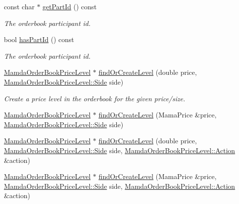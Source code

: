 \begin{CompactItemize}
const char $\ast$ \hyperlink{classWombat_1_1MamdaOrderBook_f7cd8457407380b1299466ba3e142bad}{get\-Part\-Id} () const 
\begin{CompactList}\small\item\em The orderbook participant id. \item\end{CompactList}\item 
bool \hyperlink{classWombat_1_1MamdaOrderBook_967fe8850a71364c5fef5e119d0d39a6}{has\-Part\-Id} () const 
\begin{CompactList}\small\item\em The orderbook participant id. \item\end{CompactList}\item 
\hyperlink{classWombat_1_1MamdaOrderBookPriceLevel}{Mamda\-Order\-Book\-Price\-Level} $\ast$ \hyperlink{classWombat_1_1MamdaOrderBook_b181704a75f03505d23da96a8b18ec88}{find\-Or\-Create\-Level} (double price, \hyperlink{classWombat_1_1MamdaOrderBookPriceLevel_384c34b0a74d874b8969dee9b0d3718d}{Mamda\-Order\-Book\-Price\-Level::Side} side)
\begin{CompactList}\small\item\em Create a price level in the orderbook for the given price/size. \item\end{CompactList}\item 
\hyperlink{classWombat_1_1MamdaOrderBookPriceLevel}{Mamda\-Order\-Book\-Price\-Level} $\ast$ \hyperlink{classWombat_1_1MamdaOrderBook_fd5ddeb27f947dc20adeea8579a3c7ab}{find\-Or\-Create\-Level} (Mama\-Price \&price, \hyperlink{classWombat_1_1MamdaOrderBookPriceLevel_384c34b0a74d874b8969dee9b0d3718d}{Mamda\-Order\-Book\-Price\-Level::Side} side)
\item 
\hyperlink{classWombat_1_1MamdaOrderBookPriceLevel}{Mamda\-Order\-Book\-Price\-Level} $\ast$ \hyperlink{classWombat_1_1MamdaOrderBook_2d6aa1c688aae76f33a16ec1c6419b71}{find\-Or\-Create\-Level} (double price, \hyperlink{classWombat_1_1MamdaOrderBookPriceLevel_384c34b0a74d874b8969dee9b0d3718d}{Mamda\-Order\-Book\-Price\-Level::Side} side, \hyperlink{classWombat_1_1MamdaOrderBookPriceLevel_bd3407b4250fc6f7a42d94b6d32e358a}{Mamda\-Order\-Book\-Price\-Level::Action} \&action)
\item 
\hyperlink{classWombat_1_1MamdaOrderBookPriceLevel}{Mamda\-Order\-Book\-Price\-Level} $\ast$ \hyperlink{classWombat_1_1MamdaOrderBook_8b8e155566b1a641efa55ad65dadc659}{find\-Or\-Create\-Level} (Mama\-Price \&price, \hyperlink{classWombat_1_1MamdaOrderBookPriceLevel_384c34b0a74d874b8969dee9b0d3718d}{Mamda\-Order\-Book\-Price\-Level::Side} side, \hyperlink{classWombat_1_1MamdaOrderBookPriceLevel_bd3407b4250fc6f7a42d94b6d32e358a}{Mamda\-Order\-Book\-Price\-Level::Action} \&action)

\end{CompactItemize}
